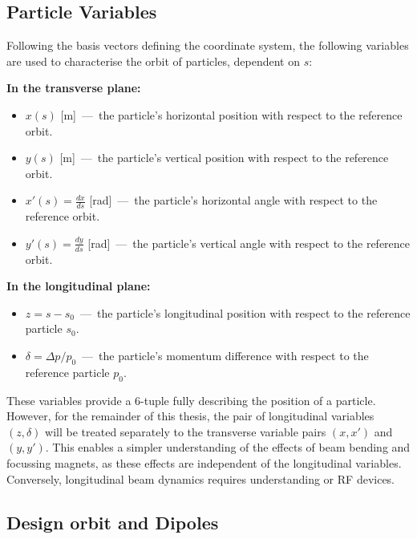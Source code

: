 \documentclass[11pt]{report}
\begin{document}
\subsection{Particle Variables}

Following the basis vectors defining the coordinate system, the following variables are used to characterise the orbit of particles, dependent on $s$:

\noindent \textbf{In the transverse plane:}
\begin{itemize}
  \item $x(s)$ [m]~---~the particle's horizontal position with respect to the reference orbit.
  \item $y(s)$ [m]~---~the particle's vertical position with respect to the reference orbit.
  \item $x'(s)=\frac{dx}{ds}$ [rad]~---~the particle's horizontal angle with respect to the reference orbit.
  \item $y'(s)=\frac{dy}{ds}$ [rad]~---~the particle's vertical angle with respect to the reference orbit.
\end{itemize}
\textbf{In the longitudinal plane:}
\begin{itemize}
    \item $z=s-s_0$~---~the particle's longitudinal position with respect to the reference particle $s_0$.
    \item $\delta = \Delta p/p_0$~---~the particle's momentum difference with respect to the reference particle $p_0$.
\end{itemize}
\item 

These variables provide a 6-tuple fully describing the position of a particle. However, for the remainder of this thesis, the pair of longitudinal variables $(z, \delta)$ will be treated separately to the transverse variable pairs $(x, x')$ and $(y, y')$. This enables a simpler understanding of the effects of beam bending and focussing magnets, as these effects are independent of the longitudinal variables. Conversely, longitudinal beam dynamics requires understanding or RF devices.

\subsection{Design orbit and Dipoles}
\end{document}

